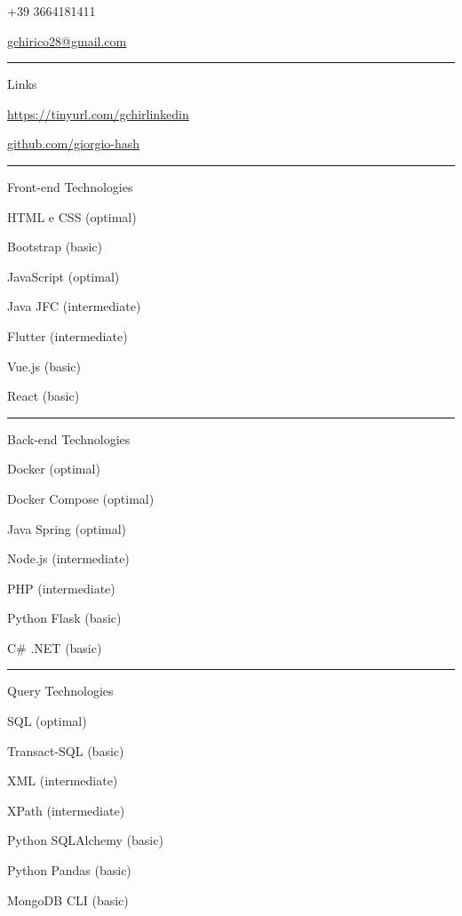 \documentclass[a4paper]{letter}
\begin{document}
\begin{minipage}[t]{0.30\textwidth}
\faPhone \quad +39 3664181411

\faEnvelope \quad \href{mailto://gchirico28@gmail.com}{gchirico28@gmail.com}

\rule{\linewidth}{0.4pt}

{\large Links}

\faLinkedin \quad \href{https://tinyurl.com/gchirlinkedin}{https://tinyurl.com/gchirlinkedin}

\faGithub \quad \href{https://github.com/giorgio-hash}{github.com/giorgio-hash}

\rule{\linewidth}{0.4pt}

{\large Front-end Technologies}

\faCode \quad HTML e CSS (optimal)

\faCode \quad Bootstrap (basic)

\faCode \quad JavaScript (optimal)

\faCode \quad Java JFC (intermediate)

\faCode \quad Flutter (intermediate)

\faCode \quad Vue.js (basic)

\faCode \quad React (basic)



\rule{\linewidth}{0.4pt}

{\large Back-end Technologies}

\faCode \quad Docker (optimal)

\faCode \quad Docker Compose (optimal)

\faCode \quad Java Spring (optimal)

\faCode \quad Node.js (intermediate)

\faCode \quad PHP (intermediate)

\faCode \quad Python Flask (basic)

\faCode \quad C\# .NET (basic)

\rule{\linewidth}{0.4pt}


{\large Query Technologies}

\faCode \quad SQL (optimal)

\faCode \quad Transact-SQL (basic)

\faCode \quad XML (intermediate)

\faCode \quad XPath (intermediate)

\faCode \quad Python SQLAlchemy (basic)

\faCode \quad Python Pandas (basic)

\faCode \quad MongoDB CLI (basic)



\end{minipage}
\end{document}
